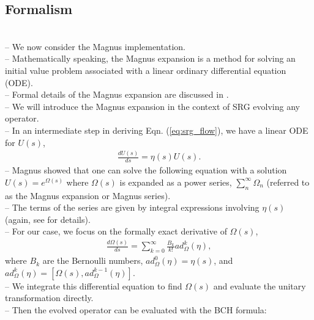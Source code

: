 \documentclass[preprintnumbers,floatfix,aps,prc,preprint,nofootinbib]{revtex4-1}
\begin{document}
\subsection{Formalism}
\label{sec:magnus_expansion_formalism}


\\
-- We now consider the Magnus implementation.
\\
-- Mathematically speaking, the Magnus expansion is a method for solving an initial value problem associated with a linear ordinary differential equation (ODE).
\\
-- Formal details of the Magnus expansion are discussed in \cite{Blanes:2009ab}.
\\
-- We will introduce the Magnus expansion in the context of SRG evolving any operator.
\\
-- In an intermediate step in deriving Eqn. (\ref{eq:srg_flow}), we have a linear ODE for $U(s)$,
%
\begin{eqnarray}
	\label{eq:unitary_trans}
	\frac{dU(s)}{ds} = \eta(s) U(s).
\end{eqnarray}
%
-- Magnus showed that one can solve the following equation with a solution $U(s)=e^{\Omega(s)}$ where $\Omega(s)$ is expanded as a power series, $\sum_{n}^{\infty} \Omega_n$ (referred to as the Magnus expansion or Magnus series).
\\
-- The terms of the series are given by integral expressions involving $\eta(s)$ (again, see \cite{Blanes:2009ab, Magnus:1954zz} for details).
\\
-- For our case, we focus on the formally exact derivative of $\Omega(s)$,
%
\begin{eqnarray}
	\label{eq:magnus_omega}
	\frac{d\Omega(s)}{ds} = \sum_{k=0}^{\infty} \frac{B_k}{k!} ad_{\Omega}^{k}(\eta),
\end{eqnarray}
%
where $B_k$ are the Bernoulli numbers, $ad_{\Omega}^{0}(\eta)=\eta(s)$, and $ad_{\Omega}^{k}(\eta)=[\Omega(s),ad_{\Omega}^{k-1}(\eta)]$.
\\
-- We integrate this differential equation to find $\Omega(s)$ and evaluate the unitary transformation directly.
\\
-- Then the evolved operator can be evaluated with the BCH formula:
\end{document}
